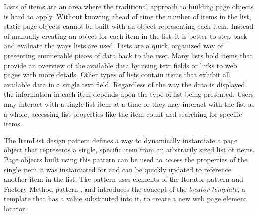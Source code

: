 Lists of items are an area where the traditional approach to building page
objects is hard to apply. Without knowing ahead of time the number of items in
the list, static page objects cannot be built with an object representing each
item. Instead of manually creating an object for each item in the list, it is
better to step back and evaluate the ways lists are used. Lists are a quick,
organized way of presenting enumerable pieces of data back to the user. Many
lists hold items that provide an overview of the available data by using text
fields or links to web pages with more details. Other types of lists contain
items that exhibit all available data in a single text field. Regardless of the
way the data is displayed, the information in each item depends upon the type
of list being presented.  Users may interact with a single list item at a time
or they may interact with the list as a whole, accessing list properties like
the item count and searching for specific items.

The ItemList design pattern defines a way to dynamically instantiate a page
object that represents a single, specific item from an arbitrarily sized list
of items. Page objects built using this pattern can be used to access the
properties of the single item it was instantiated for and can be quickly
updated to reference another item in the list. The pattern uses elements of the
Iterator pattern \cite{Gamma:1995:DPE:186897} and Factory Method pattern
\cite{Gamma:1995:DPE:186897}, and introduces the concept of the \textit{locator
template}, a template that has a value substituted into it, to create a new web
page element locator.

%


